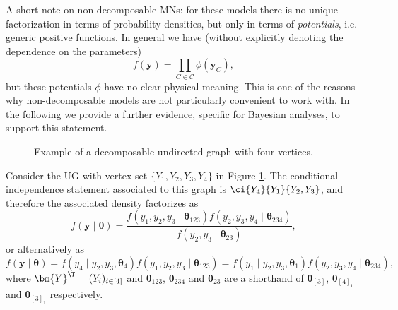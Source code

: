 A short note on non decomposable \glspl{MN}: for these models there is no unique factorization in terms of probability densities, but only in terms of \textit{potentials}, i.e. generic positive functions. In general we have (without explicitly denoting the dependence on the parameters) 
\begin{equation*}
\label{eq:nondecomposable}
f(\bm{y})=\prod_{C\in\mathcal{C}}\phi(\bm{y}_C),
\end{equation*}
but these potentials $\phi$ have no clear physical meaning. This is one of the reasons why non-decomposable models are not particularly convenient to work with. In the following we provide a further evidence, specific for Bayesian analyses, to support this statement. 

\begin{figure}
\begin{center}
\end{center}
\caption{Example of a decomposable undirected graph with four vertices. \label{fig:UG}}
\end{figure}

\begin{example}
Consider the \gls{UG}  with vertex set $\{Y_1,Y_2,Y_3,Y_4\}$ in Figure \ref{fig:UG}. The conditional independence statement associated to this graph is $
\ci{Y_4}{Y_1}{Y_2,Y_3}$,
and therefore the associated density factorizes as
\begin{equation*}
\label{eq:UGexamplefactorization}
f(\bm{y}\;|\;\bm{\theta})=\frac{f(y_1,y_2,y_3\;|\; \bm{\theta}_{123})f(y_2,y_3,y_4\;|\; \bm{\theta}_{234})}{f(y_2,y_3\;|\; \bm{\theta}_{23})},
\end{equation*}
or alternatively as
\begin{equation*}
\label{eq:UGexamplefactorization2}
f(\bm{y}\;|\;\bm{\theta})=f(y_4\;|\; y_2,y_3, \bm{\theta}_4)f(y_1,y_2,y_3\;|\; \bm{\theta}_{123})=f(y_1\;|\; y_2,y_3, \bm{\theta}_1)f(y_2,y_3,y_4\;|\; \bm{\theta}_{234}),
\end{equation*}
where $\bm{Y}^\T=(Y_i)_{i\in[4]}$ and $\bm{\theta}_{123}$, $\bm{\theta}_{234}$ and $\bm{\theta}_{23}$ are a shorthand of $\bm{\theta}_{[3]}$, $\bm{\theta}_{[4]_1}$ and $\bm{\theta}_{[3]_1}$ respectively.
\end{example}

